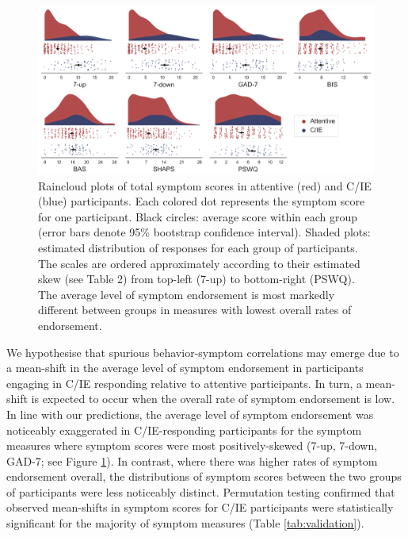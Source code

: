 \documentclass[a4paper,notitlepage,12pt]{article}
\begin{document}
\begin{refsection}[main]
\begin{figure}[t!]
\includegraphics[width=16cm]{../figures/main_02a.png}
\centering
\captionsetup{width=0.88\textwidth}
\caption{Raincloud plots of total symptom scores in attentive (red) and C/IE (blue) participants. Each colored dot represents the symptom score for one participant. Black circles: average score within each group (error bars denote 95\% bootstrap confidence interval). Shaded plots: estimated distribution of responses for each group of participants. The scales are ordered approximately according to their estimated skew (see Table 2) from top-left (7-up) to bottom-right (PSWQ). The average level of symptom endorsement is most markedly different between groups in measures with lowest overall rates of endorsement.}
\label{fig:distributions}
\end{figure}

We hypothesise that spurious behavior-symptom correlations may emerge due to a mean-shift in the average level of symptom endorsement in participants engaging in C/IE responding relative to attentive participants. In turn, a mean-shift is expected to occur when the overall rate of symptom endorsement is low. In line with our predictions, the average level of symptom endorsement was noticeably exaggerated in C/IE-responding participants for the symptom measures where symptom scores were most positively-skewed (7-up, 7-down, GAD-7; see Figure \ref{fig:distributions}). In contrast, where there was higher rates of symptom endorsement overall, the distributions of symptom scores between the two groups of participants were less noticeably distinct. Permutation testing confirmed that observed mean-shifts in symptom scores for C/IE participants were statistically significant for the majority of symptom measures (Table \ref{tab:validation}).


\end{refsection}
\end{document}
